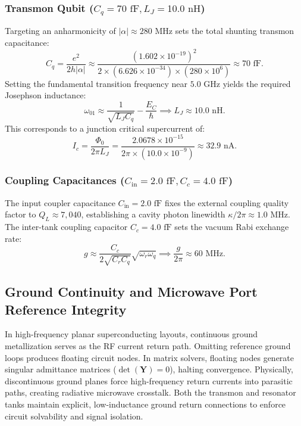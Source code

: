 \documentclass[10pt,journal,compsoc]{IEEEtran}
\begin{document}
\subsubsection{Transmon Qubit (\texorpdfstring{$C_q = 70\text{ fF}, L_J = 10.0\text{ nH}$}{Cq = 70 fF, LJ = 10.0 nH})}
Targeting an anharmonicity of $|\alpha| \approx 280\text{ MHz}$ sets the total shunting transmon capacitance:
\begin{equation}
C_q = \frac{e^2}{2 h |\alpha|} \approx \frac{(1.602\times 10^{-19})^2}{2 \times (6.626\times 10^{-34}) \times (280\times 10^6)} \approx 70\text{ fF}.
\end{equation}
Setting the fundamental transition frequency near $5.0\text{ GHz}$ yields the required Josephson inductance:
\begin{equation}
\omega_{01} \approx \frac{1}{\sqrt{L_J C_q}} - \frac{E_C}{\hbar} \implies L_J \approx 10.0\text{ nH}.
\end{equation}
This corresponds to a junction critical supercurrent of:
\begin{equation}
I_c = \frac{\Phi_0}{2\pi L_J} = \frac{2.0678 \times 10^{-15}}{2\pi \times (10.0\times 10^{-9})} \approx 32.9\text{ nA}.
\end{equation}

\subsubsection{Coupling Capacitances (\texorpdfstring{$C_{\text{in}} = 2.0\text{ fF}, C_c = 4.0\text{ fF}$}{Cin = 2.0 fF, Cc = 4.0 fF})}
The input coupler capacitance $C_{\text{in}} = 2.0\text{ fF}$ fixes the external coupling quality factor to $Q_L \approx 7{,}040$, establishing a cavity photon linewidth $\kappa/2\pi \approx 1.0\text{ MHz}$. The inter-tank coupling capacitor $C_c = 4.0\text{ fF}$ sets the vacuum Rabi exchange rate:
\begin{equation}
g \approx \frac{C_c}{2\sqrt{C_r C_q}} \sqrt{\omega_r \omega_q} \implies \frac{g}{2\pi} \approx 60\text{ MHz}.
\end{equation}

\subsection{Ground Continuity and Microwave Port Reference Integrity}
In high-frequency planar superconducting layouts, continuous ground metallization serves as the RF current return path. Omitting reference ground loops produces floating circuit nodes. In matrix solvers, floating nodes generate singular admittance matrices ($\det(\mathbf{Y}) = 0$), halting convergence. Physically, discontinuous ground planes force high-frequency return currents into parasitic paths, creating radiative microwave crosstalk. Both the transmon and resonator tanks maintain explicit, low-inductance ground return connections to enforce circuit solvability and signal isolation.
\end{document}
